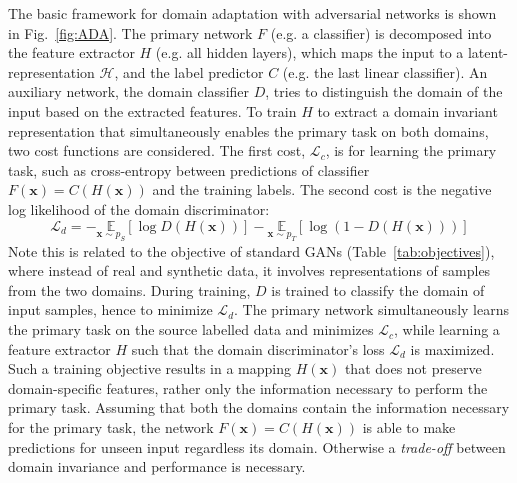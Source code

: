 \documentclass{article}
\begin{document}
The basic framework for domain adaptation with adversarial networks \cite{ganin2016domain} is shown in Fig.~\ref{fig:ADA}.
The primary network $F$ (e.g. a classifier) is decomposed into the feature extractor $H$ (e.g. all hidden layers), which maps the input to a latent-representation $\mathcal{H}$, and the label predictor $C$ (e.g. the last linear classifier). An auxiliary network, the domain classifier $D$, tries to distinguish the domain of the input based on the extracted features.
To train $H$ to extract a domain invariant representation that simultaneously enables the primary task on both domains, two cost functions are considered.
The first cost, $\mathcal{L}_c$, is for learning the primary task, such as cross-entropy between predictions of classifier $F(\mathbf{x})=C(H(\mathbf{x}))$ and the training labels. The second cost is the negative log likelihood of the domain discriminator:
\begin{equation}
\mathcal{L}_d = - \underset{\mathbf{x}\sim p_S} {\mathds{E}} [\log{D(H(\mathbf{x}))}] - \underset{\mathbf{x}\sim p_T} {\mathds{E}} [\log{(1-D(H(\mathbf{x})))}]
\end{equation}
Note this is related to the objective of standard GANs (Table~\ref{tab:objectives}), where instead of real and synthetic data, it involves representations of samples from the two domains.
During training, $D$ is trained to classify the domain of input samples, hence to minimize $\mathcal{L}_d$. The primary network simultaneously learns the primary task on the source labelled data and minimizes $\mathcal{L}_c$, while learning a feature extractor $H$ such that the domain discriminator's loss $\mathcal{L}_d$ is maximized.
Such a training objective results in a mapping $H(\mathbf{x})$ that does not preserve domain-specific features, rather only the information necessary to perform the primary task. Assuming that both the domains contain the information necessary for the primary task, the network $F(\mathbf{x})=C(H(\mathbf{x}))$ is able to make predictions for unseen input regardless its domain. Otherwise a \emph{trade-off} between domain invariance and performance is necessary.
\end{document}
